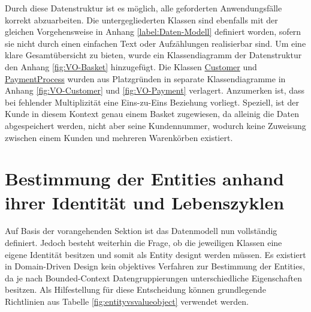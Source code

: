 \vspace{1em}

Durch diese Datenstruktur ist es möglich, alle geforderten Anwendungsfälle korrekt abzuarbeiten. Die untergegliederten Klassen sind ebenfalls mit der gleichen Vorgehensweise in Anhang \ref{label:Daten-Modell} definiert worden, sofern sie nicht durch einen einfachen Text oder Aufzählungen realisierbar sind. Um eine klare Gesamtübersicht zu bieten, wurde ein Klassendiagramm der Datenstruktur den Anhang \ref{fig:VO-Basket} hinzugefügt. Die Klassen \ul{Customer} und \ul{PaymentProcess} wurden aus Platzgründen in separate Klassendiagramme in Anhang \ref{fig:VO-Customer} und \ref{fig:VO-Payment} verlagert. Anzumerken ist, dass bei fehlender Multiplizität eine Eins-zu-Eins Beziehung vorliegt. Speziell, ist der Kunde in diesem Kontext genau einem Basket zugewiesen, da alleinig die Daten abgespeichert werden, nicht aber seine Kundennummer, wodurch keine Zuweisung zwischen einem Kunden und mehreren Warenkörben existiert.

\section{Bestimmung der Entities anhand ihrer Identität und Lebenszyklen}

Auf Basis der vorangehenden Sektion ist das Datenmodell nun vollständig definiert. Jedoch besteht weiterhin die Frage, ob die jeweiligen Klassen eine eigene Identität besitzen und somit als Entity designt werden müssen. Es existiert in Domain-Driven Design kein objektives Verfahren zur Bestimmung der Entities, da je nach Bounded-Context Datengruppierungen unterschiedliche Eigenschaften besitzen. Als Hilfestellung für diese Entscheidung können grundlegende Richtlinien aus Tabelle \ref{fig:entityvsvalueobject} verwendet werden.

